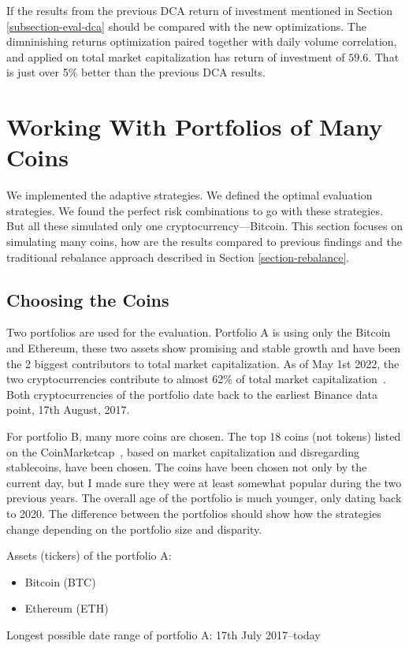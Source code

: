 If the results from the previous DCA return of investment mentioned in Section \ref{subsection-eval-dca} should be compared with the new optimizations. The dimninishing returns optimization paired together with daily volume correlation, and applied on total market capitalization has return of investment of $59.6$. That is just over 5\% better than the previous DCA results.

\section{Working With Portfolios of Many Coins}
We implemented the adaptive strategies. We defined the optimal evaluation strategies. We found the perfect risk combinations to go with these strategies. But all these simulated only one cryptocurrency---Bitcoin. This section focuses on simulating many coins, how are the results compared to previous findings and the traditional rebalance approach described in Section \ref{section-rebalance}.

\subsection{Choosing the Coins}
Two portfolios are used for the evaluation. Portfolio A is using only the Bitcoin and Ethereum, these two assets show promising and stable growth and have been the 2 biggest contributors to total market capitalization. As of May 1st 2022, the two cryptocurrencies contribute to almost 62\% of total market capitalization~\cite{coinmarketcap:globalmetrics}. Both cryptocurrencies of the portfolio date back to the earliest Binance data point, 17th August, 2017.

For portfolio B, many more coins are chosen. The top 18 coins (not tokens) listed on the CoinMarketcap~\cite{coinmarketcap}, based on market capitalization and disregarding stablecoins, have been chosen. The coins have been chosen not only by the current day, but I made sure they were at least somewhat popular during the two previous years. The overall age of the portfolio is much younger, only dating back to 2020. The difference between the portfolios should show how the strategies change depending on the portfolio size and disparity.

Assets (tickers) of the portfolio A:
\begin{itemize}
    \item Bitcoin (BTC)
    \item Ethereum (ETH)
\end{itemize}
Longest possible date range of portfolio A: 17th July 2017--today

